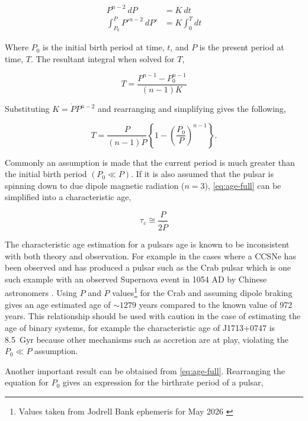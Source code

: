 \begin{align}
    P^{n-2}~dP &= K~dt \\
    \int^P_{P_0} P'^{n-2} ~dP'&=K \int_0^T dt     
\end{align}

Where $P_0$ is the initial birth period at time, $t$, and $P$ is the present period at time, $T$. The resultant integral when solved for $T$, 

\begin{equation}
    T = \frac{P^{n-1} - P^{n-1}_0}{(n-1)K}
\end{equation}

Substituting $K=\dot P P^{n-2}$ and rearranging and simplifying gives the following, 


\begin{equation}
    T = \frac{P}{(n-1)\dot P} \left\{ 1 - \left( \frac{P_0}{P} \right)^{n - 1} \right\} .
    \label{eq:age-full}
\end{equation}

Commonly an assumption is made that the current period is much greater than the initial birth period $(P_0 \ll P)$. If it is also assumed that the pulsar is spinning down to due dipole magnetic radiation ($n=3$), \cref{eq:age-full} can be simplified into a characteristic age, 

\begin{equation}
    \tau_c \cong \frac{P}{2 \dot P}
\end{equation}

The characteristic age estimation for a pulsars age is known to be inconsistent with both theory and observation. For example in the cases where a CCSNe has been observed and has produced a pulsar such as the Crab pulsar which is one such example with an observed Supernova event in 1054 AD by Chinese astronomers \citep{kaspi_chandra_2001}. Using $P$ and $\dot P$ values\footnote{Values taken from Jodrell Bank ephemeris for May 2026 \citep{lyne_23_1993}} for the Crab and assuming dipole braking gives an age estimated age of $\sim 1279$ years compared to the known value of 972 years. This relationship should be used with caution in the case of estimating the age of binary systems, for example the characteristic age of J1713+0747 is 8.5~Gyr because other mechanisms such as accretion are at play, violating the $P_0 \ll P$ assumption. 

Another important result can be obtained from \cref{eq:age-full}. Rearranging the equation for $P_0$ gives an expression for the birthrate period of a pulsar, 


